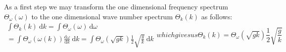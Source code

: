 As a first step we may transform the one dimensional frequency spectrum 
$\Theta_{\omega}(\omega)$ to the one dimensional wave number 
spectrum $\Theta_k(k)$ as follows:
\begin{subequations}
\begin{multline}
 \int\Theta_k(k)~\mathrm{d}k = \int\Theta_{\omega}(\omega)~\mathrm{d}\omega\\ = 
\int\Theta_{\omega}(\omega(k))\frac{\mathrm{d}\omega}{\mathrm{d}k}~\mathrm{d}k
= \int\Theta_{\omega}(\sqrt{gk})\frac{1}{2}\sqrt{\frac{g}{k}}~\mathrm{d}k
\end{multline}
which gives us
\begin{equation}
\label{eq:theta_k}
 \Theta_k(k) = \Theta_{\omega}(\sqrt{gk})\frac{1}{2}\sqrt{\frac{g}{k}}
\end{equation}
\end{subequations}
%
